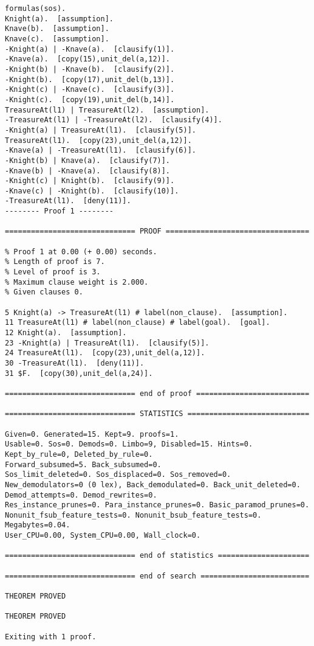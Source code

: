 \documentclass[a4paper,12pt]{article}
\begin{document}
\begin{lstlisting}[language=Prover9]
formulas(sos).
Knight(a).  [assumption].
Knave(b).  [assumption].
Knave(c).  [assumption].
-Knight(a) | -Knave(a).  [clausify(1)].
-Knave(a).  [copy(15),unit_del(a,12)].
-Knight(b) | -Knave(b).  [clausify(2)].
-Knight(b).  [copy(17),unit_del(b,13)].
-Knight(c) | -Knave(c).  [clausify(3)].
-Knight(c).  [copy(19),unit_del(b,14)].
TreasureAt(l1) | TreasureAt(l2).  [assumption].
-TreasureAt(l1) | -TreasureAt(l2).  [clausify(4)].
-Knight(a) | TreasureAt(l1).  [clausify(5)].
TreasureAt(l1).  [copy(23),unit_del(a,12)].
-Knave(a) | -TreasureAt(l1).  [clausify(6)].
-Knight(b) | Knave(a).  [clausify(7)].
-Knave(b) | -Knave(a).  [clausify(8)].
-Knight(c) | Knight(b).  [clausify(9)].
-Knave(c) | -Knight(b).  [clausify(10)].
-TreasureAt(l1).  [deny(11)].
-------- Proof 1 --------

============================== PROOF =================================

% Proof 1 at 0.00 (+ 0.00) seconds.
% Length of proof is 7.
% Level of proof is 3.
% Maximum clause weight is 2.000.
% Given clauses 0.

5 Knight(a) -> TreasureAt(l1) # label(non_clause).  [assumption].
11 TreasureAt(l1) # label(non_clause) # label(goal).  [goal].
12 Knight(a).  [assumption].
23 -Knight(a) | TreasureAt(l1).  [clausify(5)].
24 TreasureAt(l1).  [copy(23),unit_del(a,12)].
30 -TreasureAt(l1).  [deny(11)].
31 $F.  [copy(30),unit_del(a,24)].

============================== end of proof ==========================

============================== STATISTICS ============================

Given=0. Generated=15. Kept=9. proofs=1.
Usable=0. Sos=0. Demods=0. Limbo=9, Disabled=15. Hints=0.
Kept_by_rule=0, Deleted_by_rule=0.
Forward_subsumed=5. Back_subsumed=0.
Sos_limit_deleted=0. Sos_displaced=0. Sos_removed=0.
New_demodulators=0 (0 lex), Back_demodulated=0. Back_unit_deleted=0.
Demod_attempts=0. Demod_rewrites=0.
Res_instance_prunes=0. Para_instance_prunes=0. Basic_paramod_prunes=0.
Nonunit_fsub_feature_tests=0. Nonunit_bsub_feature_tests=0.
Megabytes=0.04.
User_CPU=0.00, System_CPU=0.00, Wall_clock=0.

============================== end of statistics =====================

============================== end of search =========================

THEOREM PROVED

THEOREM PROVED

Exiting with 1 proof.
\end{lstlisting}
\end{document}
